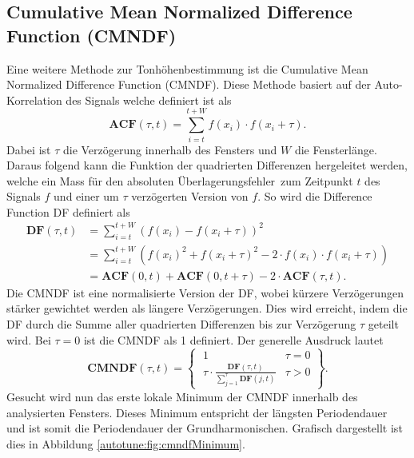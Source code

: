 \subsection{Cumulative Mean Normalized Difference Function (CMNDF)
\label{autotune:subsection:cumultativeMeanNormalizedDifferenceFunction}}
Eine weitere Methode zur Tonhöhenbestimmung ist die Cumulative Mean Normalized Difference Function (CMNDF).
Diese Methode basiert auf der Auto-Korrelation des Signals welche definiert ist als
\begin{equation}
    \mathbf{ACF}(\tau, t)
    =
    \sum_{i=t}^{t+W}f(x_i)\cdot f(x_i+\tau).
\end{equation}
Dabei ist $\tau$ die Verzögerung innerhalb des Fensters und $W$ die Fensterlänge.
Daraus folgend kann die Funktion der quadrierten Differenzen hergeleitet werden,
welche ein Mass für den absoluten \glqq Überlagerungsfehler\grqq\ zum Zeitpunkt $t$ des Signals $f$ und einer um $\tau$ verzögerten Version von $f$.
So wird die Difference Function DF definiert als
\begin{equation}
    \begin{aligned}
        \mathbf{DF}(\tau,t)
        &= \sum_{i=t}^{t+W}\left(f(x_i)-f(x_i+\tau)\right)^2 \\
        &= \sum_{i=t}^{t+W}\left(f(x_i)^2+f(x_i+\tau)^2-2 \cdot f(x_i) \cdot f(x_i + \tau)\right) \\
        &= \mathbf{ACF}(0,t)+\mathbf{ACF}(0,t+\tau)-2\cdot \mathbf{ACF}(\tau,t).
    \end{aligned}
\end{equation}
Die CMNDF ist eine normalisierte Version der DF,
wobei kürzere Verzögerungen stärker gewichtet werden als längere Verzögerungen.
Dies wird erreicht, indem die DF durch die Summe aller quadrierten Differenzen bis zur Verzögerung $\tau$ geteilt wird.
Bei $\tau=0$ ist die CMNDF als 1 definiert.
Der generelle Ausdruck lautet
\begin{equation}
    \mathbf{CMNDF}(\tau,t)
    =
    \left\{
        \;\begin{array}{ll} 1 & \tau=0 \\
        \tau \cdot \frac{\mathbf{DF}(\tau,t)}{\sum\nolimits_{j=1}^{\tau} \mathbf{DF}(j,t)} & \tau > 0 \end{array}
    \right\}.
\end{equation}
Gesucht wird nun das erste lokale Minimum der CMNDF innerhalb des analysierten Fensters.
Dieses Minimum entspricht der längsten Periodendauer und ist somit die Periodendauer der Grundharmonischen.
Grafisch dargestellt ist dies in Abbildung \ref{autotune:fig:cmndfMinimum}.
